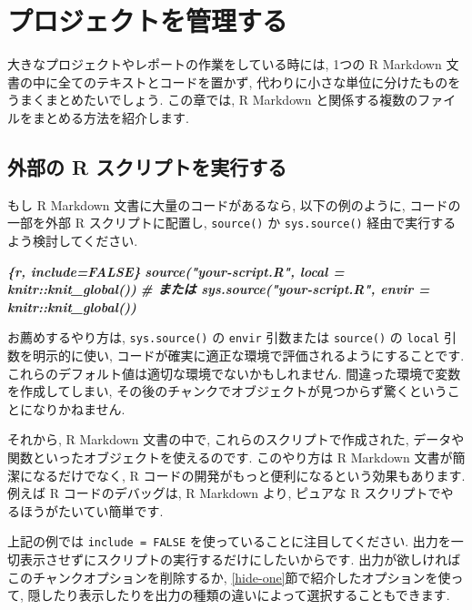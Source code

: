 \documentclass[
  11pt,
  lualatex,
  ja=standard]{bxjsreport}
\newenvironment{Shaded}{\begin{snugshade}}{\end{snugshade}}
\newcommand{\InformationTok}[1]{\textcolor[rgb]{0.56,0.35,0.01}{\textbf{\textit{#1}}}}
\begin{document}
\hypertarget{managing-projects}{%
\chapter{プロジェクトを管理する}\label{managing-projects}}

大きなプロジェクトやレポートの作業をしている時には, 1つの R Markdown 文書の中に全てのテキストとコードを置かず, 代わりに小さな単位に分けたものをうまくまとめたいでしょう. この章では, R Markdown と関係する複数のファイルをまとめる方法を紹介します.

\hypertarget{source-script}{%
\section{外部の R スクリプトを実行する}\label{source-script}}

もし R Markdown 文書に大量のコードがあるなら, 以下の例のように, コードの一部を外部 R スクリプトに配置し, \texttt{source()} か \texttt{sys.source()} 経由で実行するよう検討してください.

\begin{Shaded}
\begin{Highlighting}[]
\InformationTok{\textasciigrave{}\textasciigrave{}\textasciigrave{}\{r, include=FALSE\}}
\InformationTok{source("your{-}script.R", local = knitr::knit\_global())}
\InformationTok{\# または sys.source("your{-}script.R", envir = knitr::knit\_global())}
\InformationTok{\textasciigrave{}\textasciigrave{}\textasciigrave{}}
\end{Highlighting}
\end{Shaded}

お薦めするやり方は, \texttt{sys.source()} の \texttt{envir} 引数または \texttt{source()} の \texttt{local} 引数を明示的に使い, コードが確実に適正な環境で評価されるようにすることです. これらのデフォルト値は適切な環境でないかもしれません. 間違った環境で変数を作成してしまい, その後のチャンクでオブジェクトが見つからず驚くということになりかねません.

それから, R Markdown 文書の中で, これらのスクリプトで作成された, データや関数といったオブジェクトを使えるのです. このやり方は R Markdown 文書が簡潔になるだけでなく, R コードの開発がもっと便利になるという効果もあります. 例えば R コードのデバッグは, R Markdown より, ピュアな R スクリプトでやるほうがたいてい簡単です.

上記の例では \texttt{include = FALSE} を使っていることに注目してください. 出力を一切表示させずにスクリプトの実行するだけにしたいからです. 出力が欲しければこのチャンクオプションを削除するか, \ref{hide-one}節で紹介したオプションを使って, 隠したり表示したりを出力の種類の違いによって選択することもできます.
\end{document}
